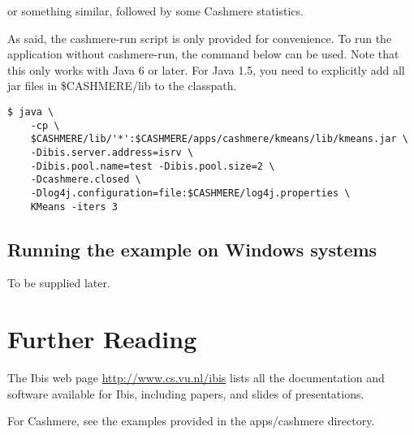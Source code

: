 \documentclass[a4paper,10pt]{article}
\begin{document}
or something similar, followed by some Cashmere statistics.

As said, the cashmere-run script is only provided for convenience. To run
the application without cashmere-run, the command below can be used.
Note that this only works with Java 6 or later. For Java 1.5, you need to
explicitly add all jar files in \$CASHMERE/lib to the classpath.

\noindent
{\small
\begin{verbatim}
$ java \
    -cp \
    $CASHMERE/lib/'*':$CASHMERE/apps/cashmere/kmeans/lib/kmeans.jar \
    -Dibis.server.address=isrv \
    -Dibis.pool.name=test -Dibis.pool.size=2 \
    -Dcashmere.closed \
    -Dlog4j.configuration=file:$CASHMERE/log4j.properties \
    KMeans -iters 3
\end{verbatim}
}
\noindent

\subsection{Running the example on Windows systems}

To be supplied later.

\section{Further Reading}

The Ibis web page \url{http://www.cs.vu.nl/ibis} lists all
the documentation and software available for Ibis, including papers, and
slides of presentations.

For Cashmere, see the examples provided in the apps/cashmere directory.
\end{document}

